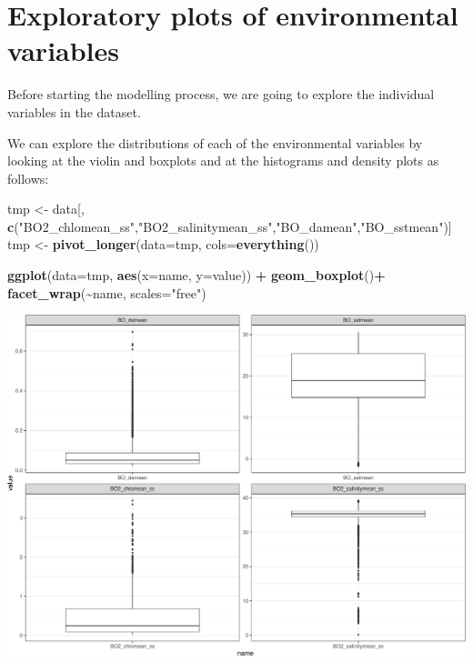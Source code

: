 \documentclass[
]{book}
\newenvironment{Shaded}{\begin{snugshade}}{\end{snugshade}}
\newcommand{\AttributeTok}[1]{\textcolor[rgb]{0.13,0.29,0.53}{#1}}
\newcommand{\FunctionTok}[1]{\textcolor[rgb]{0.13,0.29,0.53}{\textbf{#1}}}
\newcommand{\NormalTok}[1]{#1}
\newcommand{\OtherTok}[1]{\textcolor[rgb]{0.56,0.35,0.01}{#1}}
\newcommand{\SpecialCharTok}[1]{\textcolor[rgb]{0.81,0.36,0.00}{\textbf{#1}}}
\newcommand{\StringTok}[1]{\textcolor[rgb]{0.31,0.60,0.02}{#1}}
\begin{document}
\section{Exploratory plots of environmental variables}\label{exploratory-plots-of-environmental-variables}

Before starting the modelling process, we are going to explore the individual variables in the dataset.

We can explore the distributions of each of the environmental variables by looking at the violin and boxplots and at the histograms and density plots as follows:

\begin{Shaded}
\begin{Highlighting}[]
\NormalTok{tmp }\OtherTok{\textless{}{-}}\NormalTok{ data[, }\FunctionTok{c}\NormalTok{(}\StringTok{"BO2\_chlomean\_ss"}\NormalTok{,}\StringTok{"BO2\_salinitymean\_ss"}\NormalTok{,}\StringTok{"BO\_damean"}\NormalTok{,}\StringTok{"BO\_sstmean"}\NormalTok{)]}
\NormalTok{tmp }\OtherTok{\textless{}{-}} \FunctionTok{pivot\_longer}\NormalTok{(}\AttributeTok{data=}\NormalTok{tmp, }\AttributeTok{cols=}\FunctionTok{everything}\NormalTok{()) }

\FunctionTok{ggplot}\NormalTok{(}\AttributeTok{data=}\NormalTok{tmp, }\FunctionTok{aes}\NormalTok{(}\AttributeTok{x=}\NormalTok{name, }\AttributeTok{y=}\NormalTok{value)) }\SpecialCharTok{+} 
  \FunctionTok{geom\_boxplot}\NormalTok{()}\SpecialCharTok{+}
  \FunctionTok{facet\_wrap}\NormalTok{(}\SpecialCharTok{\textasciitilde{}}\NormalTok{name, }\AttributeTok{scales=}\StringTok{"free"}\NormalTok{)}
\end{Highlighting}
\end{Shaded}

\includegraphics{_main_files/figure-latex/unnamed-chunk-48-1.pdf}
\end{document}
